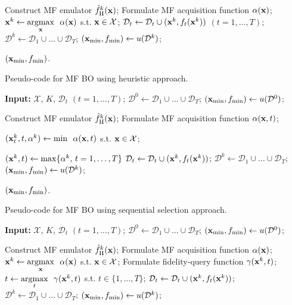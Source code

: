 \documentclass[iicol,sn-basic]{sn-jnl}%
\theoremstyle{thmstyleone}%
\theoremstyle{thmstyletwo}
\theoremstyle{thmstylethree}
\begin{document}
\begin{linenumbers}
\begin{algorithm}
\begin{algorithmic}[1]
		\State Construct MF emulator $\hat{f}_\text{H}^k({\bf x})$;
		\State Formulate MF acquisition function $\alpha({\bf x})$;
		\State ${\bf x}^{k} \gets \underset{{\bf x}}{\mathrm{argmax}} \ \ \alpha({\bf x})$ s.t. ${\bf x} \in \mathcal{X}$;
		\State $\mathcal{D}_t \gets \mathcal{D}_t \cup ({\bf x}^{k},f_t({\bf x}^{k}))$ $(t=1,\dots,T)$;
		\State $\mathcal{D}^k \gets \mathcal{D}_1 \cup \dots \cup \mathcal{D}_T$;
		\State $({\bf x}_{\min},f_{\min}) \gets u(\mathcal{D}^k)$;
		\EndFor
		
		\State \Return $({\bf x}_{\min},f_{\min})$.
	\end{algorithmic}
\end{algorithm}

\begin{algorithm}
	\caption{Pseudo-code for MF BO using heuristic approach.}\label{Algo4}
	\begin{algorithmic}[1]
		\State \textbf{Input:} $\mathcal{X}$, $K$, $\mathcal{D}_t$ $(t=1,\dots,T)$;
		\State $\mathcal{D}^0 \gets \mathcal{D}_1 \cup \dots \cup \mathcal{D}_T$;
		\State $({\bf x}_{\min},f_{\min}) \gets u(\mathcal{D}^0)$;
		
		\State Construct MF emulator $\hat{f}_\text{H}^k({\bf x})$;
		\State Formulate MF acquisition function $\alpha({\bf x},t)$;
		
		\State $({\bf x}_t^{k},t,\alpha^k) \gets {\min }\ \ \alpha({\bf x},t)$ s.t. ${\bf x} \in \mathcal{X}$;
		\EndFor
		
		\State $({\bf x}^{k},t) \gets\max\{\alpha^k,\, t=1,\dots, T\}$
		\State $\mathcal{D}_t \gets \mathcal{D}_t \cup ({\bf x}^{k},f_t({\bf x}^{k}))$;
		\State $\mathcal{D}^k \gets \mathcal{D}_1 \cup \dots \cup \mathcal{D}_T$;
		\State $({\bf x}_{\min},f_{\min}) \gets u(\mathcal{D}^k)$;
		\EndFor
		
		\State \Return $({\bf x}_{\min},f_{\min})$.
	\end{algorithmic}
\end{algorithm}


\begin{algorithm}
	\caption{Pseudo-code for MF BO using sequential selection approach.}\label{Algo5}
	\begin{algorithmic}[1]
		\State \textbf{Input:} $\mathcal{X}$, $K$, $\mathcal{D}_t$ $(t=1,\dots,T)$;
		\State $\mathcal{D}^0 \gets \mathcal{D}_1 \cup \dots \cup \mathcal{D}_T$;
		\State $({\bf x}_{\min},f_{\min}) \gets u(\mathcal{D}^0)$;
		
		\State Construct MF emulator $\hat{f}_\text{H}^k({\bf x})$;
		\State Formulate MF acquisition function $\alpha({\bf x})$;
		\State ${\bf x}^{k} \gets \underset{{\bf x}}{\mathrm{argmax}} \ \ \alpha({\bf x})$ s.t. ${\bf x} \in \mathcal{X}$;
		\State Formulate fidelity-query function $\gamma({\bf x}^{k},t)$;
		\State $t \gets \underset{t}{\mathrm{argmax}} \ \ \gamma({\bf x}^{k},t)$ s.t. $t \in \{1,\dots,T\}$;
		\State $\mathcal{D}_t \gets \mathcal{D}_t \cup ({\bf x}^{k},f_t({\bf x}^{k}))$;
		\State $\mathcal{D}^k \gets \mathcal{D}_1 \cup \dots \cup \mathcal{D}_T$;
		\State $({\bf x}_{\min},f_{\min}) \gets u(\mathcal{D}^k)$;
		\EndFor
		

\end{algorithmic}
\end{algorithm}
\end{linenumbers}
\end{document}

